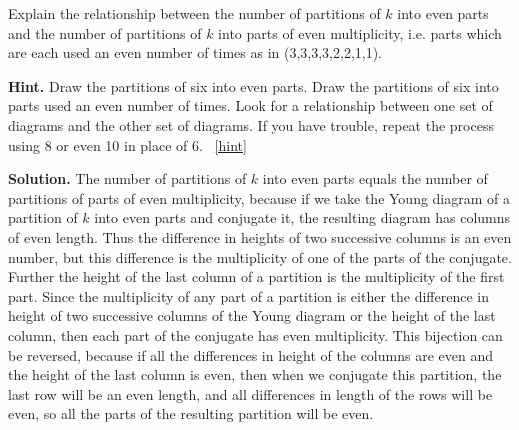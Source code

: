 \documentclass{book}
\begin{document}
\setcounter{project}{306}
\addtocounter{project}{-1}
\begin{activity}[]\label{partition-even-mult-even-use}
\hypertarget{p-1538}{}%
Explain the relationship between the number of partitions of \(k\) into even parts and the number of partitions of \(k\) into parts of even multiplicity, i.e. parts which are each used an even number of times as in (3,3,3,3,2,2,1,1).%
\par\smallskip%
\noindent\textbf{Hint.}\hypertarget{hint-192}{}\quad%
\hypertarget{p-1539}{}%
Draw the partitions of six into even parts. Draw the partitions of six into parts used an even number of times. Look for a relationship between one set of diagrams and the other set of diagrams. If you have trouble, repeat the process using 8 or even 10 in place of 6.%
~\hfill{\tiny\hyperlink{a-306}{[hint]}\hypertarget{q-306}{}}\par\smallskip%
\noindent\textbf{Solution.}\hypertarget{solution-204}{}\quad%
\hypertarget{p-1540}{}%
The number of partitions of \(k\) into even parts equals the number of partitions of parts of even multiplicity, because if we take the Young diagram of a partition of \(k\) into even parts and conjugate it, the resulting diagram has columns of even length. Thus the difference in heights of two successive columns is an even number, but this difference is the multiplicity of one of the parts of the conjugate. Further the height of the last column of a partition is the multiplicity of the first part. Since the multiplicity of any part of a partition is either the difference in height of two successive columns of the Young diagram or the height of the last column, then each part of the conjugate has even multiplicity. This bijection can be reversed, because if all the differences in height of the columns are even and the height of the last column is even, then when we conjugate this partition, the last row will be an even length, and all differences in length of the rows will be even, so all the parts of the resulting partition will be even.%
\end{activity}
\end{document}
